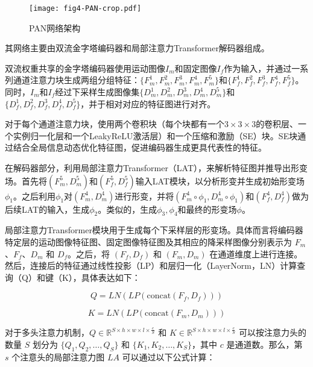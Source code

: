 \begin{figure}[h]
    \centering
    \texttt{[image: fig4-PAN-crop.pdf]}
    \caption{PAN网络架构}
    \label{fig:4}
\end{figure}

其网络主要由双流金字塔编码器和局部注意力Transformer解码器组成。

双流权重共享的金字塔编码器使用运动图像$I_m$和固定图像$I_f$作为输入，并通过一系列通道注意力块生成两组分组特征：$\{F_m^1,F_m^2,F_m^3,F_m^4,F_m^5\}$和$\{F_f^1,F_f^2,F_f^3,F_f^4,F_f^5\}$。同时，$I_m$和$I_f$经过下采样生成图像集$\{D_m^1,D_m^2,D_m^3,D_m^4,D_m^5\}$和$\{D_f^1,D_f^2,D_f^3,D_f^4,D_f^5\}$，并于相对对应的特征图进行对齐。

对于每个通道注意力块，使用两个卷积块（每个块都有一个$3\times3\times 3$的卷积层、一个实例归一化层\cite{ulyanov2016instance}和一个LeakyReLU激活层）和一个压缩和激励（SE）块\cite{hu2018squeeze}。SE块通过结合全局信息动态优化特征图，促进编码器生成更具代表性的特征。

在解码器部分，利用局部注意力Transformer（LAT），来解析特征图并推导出形变场。首先将$(F_m^5,D_m^5)$和$(F_f^5,D_f^5)$输入LAT模块，以分析形变并生成初始形变场$\phi_1$。之后利用$\phi_1$对$(F_m^4,D_m^4)$进行形变，并将$(F_m^4\circ \phi_1,D_m^4\circ\phi_1 )$和$(F_f^4,D_f^4)$做为后续LAT的输入，生成$\phi_2$。类似的，生成$\phi_3,\phi_4$和最终的形变场$\phi$。




局部注意力Transformer模块用于生成每个下采样层的形变场。具体而言将编码器特定层的运动图像特征图、固定图像特征图及其相应的降采样图像分别表示为 \( F_m \)、\( F_f \)、\( D_m \) 和 \( D_f \)。之后，将 \( (F_f, D_f) \) 和 \( (F_m, D_m) \) 在通道维度上进行连接。然后，连接后的特征通过线性投影（LP）和层归一化（LayerNorm，LN）计算查询（Q）和键（K），具体表达如下：

\begin{equation}
    Q = LN(LP(\text{concat}(F_f, D_f)))
\end{equation}

\begin{equation}
    K = LN(LP(\text{concat}(F_m, D_m)))
\end{equation}

对于多头注意力机制，\( Q \in \mathbb{R}^{S \times h \times w \times l \times \frac{c}{S}} \) 和 \( K \in \mathbb{R}^{S \times h \times w \times l \times \frac{c}{S}} \) 可以按注意力头的数量 \( S \) 划分为 \( \{ Q_1, Q_2, \ldots, Q_S \} \) 和 \( \{ K_1, K_2, \ldots, K_S \} \)，其中 \( c \) 是通道数。那么，第 \( s \) 个注意头的局部注意力图 \( LA \) 可以通过以下公式计算：

